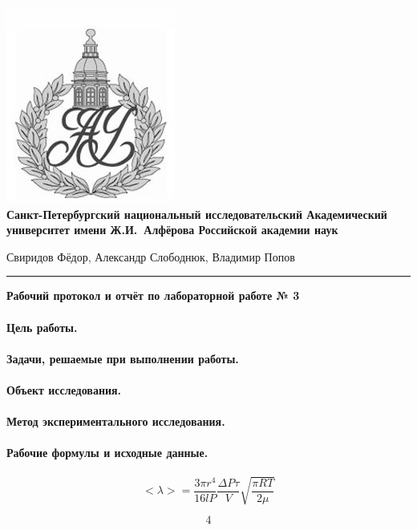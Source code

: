 \documentclass{article}
\begin{document}
\begin{center}
	\includegraphics[scale=0.25]{AU}\\
	{\Large\bfseries Санкт-Петербургский национальный исследовательский Академический университет имени Ж.И.~Алфёрова Российской академии наук}
\end{center}

\begin{center}
	Свиридов Фёдор, Александр Слободнюк, Владимир Попов
\end{center}
\rule{12cm}{0.4mm}
\begin{center}
	{\large\textbf{Рабочий протокол и отчёт по лабораторной работе № 3}}
\end{center}

\paragraph{Цель работы.}

\paragraph{Задачи, решаемые при выполнении работы.}

\paragraph{Объект исследования.}

\paragraph{Метод экспериментального исследования.}

 \paragraph{Рабочие формулы и исходные данные.}\hypertarget{formuls}{}
 \begin{equation}
 	<\lambda>=\frac{3\pi r^4}{16lP} \frac{\Delta P\tau}{V} \sqrt{\frac{\pi RT}{2\mu}}
 \end{equation}

\begin{equation}
	4
\end{equation}
\end{document}
